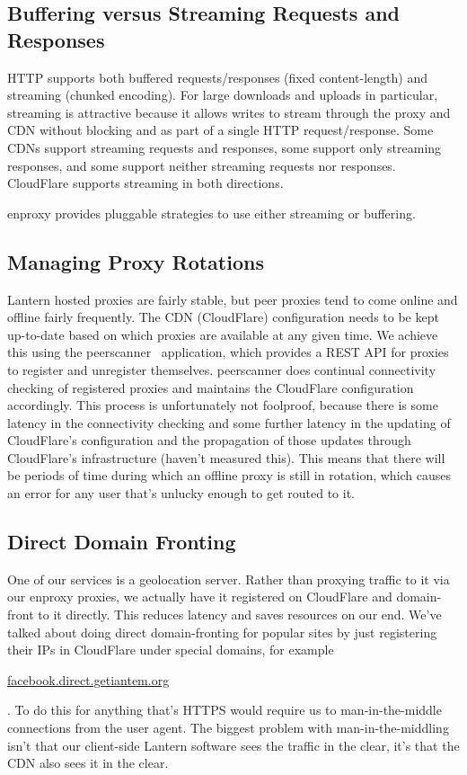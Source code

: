 \documentclass{sig-alternate}
\def\urll#1{\begin{NoHyper}\url{#1}\end{NoHyper}}
\begin{document}
\subsection{Buffering versus Streaming Requests and Responses}
HTTP supports both buffered requests/responses (fixed content-length) and
streaming (chunked encoding). For large downloads and uploads in
particular, streaming is attractive because it allows writes to stream
through the proxy and CDN without blocking and as part of a single HTTP
request/response.  Some CDNs support streaming requests and responses, some
support only streaming responses, and some support neither streaming
requests nor responses.  CloudFlare supports streaming in both directions.

enproxy provides pluggable strategies to use either streaming or
buffering.

\subsection{Managing Proxy Rotations}
Lantern hosted proxies are fairly stable, but peer proxies tend to come
online and offline fairly frequently. The CDN (CloudFlare) configuration
needs to be kept up-to-date based on which proxies are available at any
given time. We achieve this using the peerscanner~\cite{peerscanner} application, which
provides a REST API for proxies to register and unregister themselves.
peerscanner does continual connectivity checking of registered proxies and
maintains the CloudFlare configuration accordingly. This process is
unfortunately not foolproof, because there is some latency in the
connectivity checking and some further latency in the updating of
CloudFlare's configuration and the propagation of those updates through
CloudFlare's infrastructure (haven't measured this).  This means that there
will be periods of time during which an offline proxy is still in rotation,
which causes an error for any user that's unlucky enough to get routed to
it.

\subsection{Direct Domain Fronting}
One of our services is a geolocation server. Rather than proxying traffic to it
via our enproxy proxies, we actually have it registered on CloudFlare and
domain-front to it directly.  This reduces latency and saves resources on our
end.  We've talked about doing direct domain-fronting for popular sites by just
registering their IPs in CloudFlare under special domains, for example
\urll{facebook.direct.getiantem.org}.  To do this for anything that's HTTPS would
require us to man-in-the-middle connections from the user agent.  The biggest
problem with man-in-the-middling isn't that our client-side Lantern software
sees the traffic in the clear, it's that the CDN also sees it in the clear.
\end{document}
